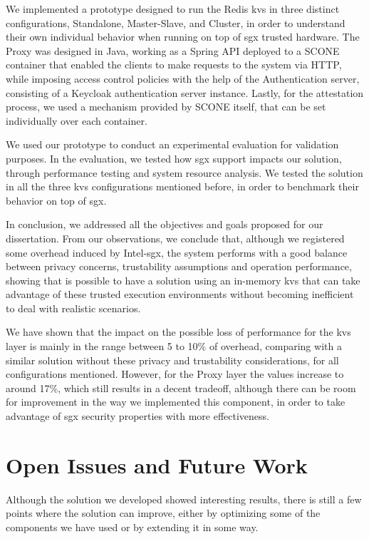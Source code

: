 We implemented a prototype designed to run the Redis \gls{kvs} in three distinct configurations, Standalone, Master-Slave, and Cluster, in order to understand their own individual behavior when running on top of \gls{sgx} trusted hardware. 
The Proxy was designed in Java, working as a Spring API deployed to a SCONE container that enabled the clients to make requests to the system via HTTP, while imposing access control policies with the help of the Authentication server, consisting of a Keycloak authentication server instance. 
Lastly, for the attestation process, we used a mechanism provided by SCONE itself, that can be set individually over each container.

We used our prototype to conduct an experimental evaluation for validation purposes. In the evaluation, we tested how \gls{sgx} support impacts our solution, through performance testing and system resource analysis. We tested the solution in all the three \gls{kvs} configurations mentioned before, in order to benchmark their behavior on top of \gls{sgx}.

In conclusion, we addressed all the objectives and goals proposed for our dissertation. From our observations, we conclude that, although we registered some overhead induced by Intel-\gls{sgx}, the system performs with a good balance between privacy concerns, trustability assumptions and operation performance, showing that is possible to have a solution using an in-memory \gls{kvs} that can take advantage of these trusted execution environments without becoming inefficient to deal with realistic scenarios.

We have shown that the impact on the possible loss of performance for the \gls{kvs} layer is mainly in the range between 5 to 10\% of overhead, comparing with a similar solution without these privacy and trustability considerations, for all configurations mentioned. However, for the Proxy layer the values increase to around 17\%, which still results in a decent tradeoff, although there can be room for improvement in the way we implemented this component, in order to take advantage of \gls{sgx} security properties with more effectiveness.

\section{Open Issues and Future Work}

Although the solution we developed showed interesting results, there is still a few points where the solution can improve, either by optimizing some of the components we have used or by extending it in some way.

